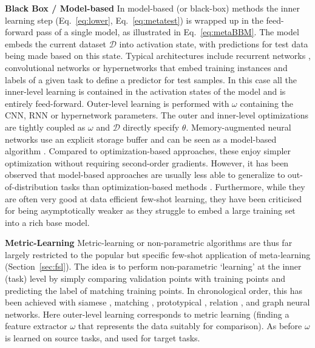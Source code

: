 \documentclass[10pt,journal,compsoc]{IEEEtran}
\newcommand{\keypoint}[1]{\vspace{0.1cm}\noindent\textbf{#1}\quad}
\begin{document}
\keypoint{Black Box / Model-based} In model-based (or black-box) methods the inner learning step (Eq.~\ref{eq:lower}, Eq.~\ref{eq:metatest}) is wrapped up in the feed-forward pass of a single model, as illustrated in Eq.~\ref{eq:metaBBM}. The model embeds the current dataset $\mathcal{D}$ into activation state, with predictions for test data being made based on this state. Typical architectures include recurrent networks \cite{hochreiter2001learning, ravi2016optimization}, convolutional networks \cite{mishra2017simple} or hypernetworks \cite{qiao2017parametersfromactivations, gidaris2018dynamicfewshot} that embed training instances and labels of a given task to define a predictor for test samples. In this case all the inner-level learning is contained in the activation states of the model and is entirely feed-forward. Outer-level learning is performed with $\omega$ containing the CNN, RNN or hypernetwork parameters. The outer and inner-level optimizations are tightly coupled as $\omega$ and $\mathcal{D}$ directly specify $\theta$. Memory-augmented neural networks \cite{graves2014neuralturing} use an explicit storage buffer and can be seen as a model-based algorithm \cite{santoro2016metamemory,munkhdalai2017metanets}. Compared to optimization-based approaches, these enjoy simpler optimization without requiring second-order gradients. However, it has been observed that model-based approaches are usually less able to generalize to out-of-distribution tasks than optimization-based methods \cite{finn2018metauniversal}. Furthermore, while they are often very good at data efficient few-shot learning, they have been criticised for being asymptotically weaker \cite{finn2018metauniversal} as they struggle to embed a large training set into a rich base model.

\keypoint{Metric-Learning} Metric-learning or non-parametric algorithms are thus far largely restricted to the popular but specific few-shot application of meta-learning (Section~\ref{sec:fsl}). The idea is to perform non-parametric `learning' at the inner (task) level by simply comparing validation points with training points and predicting the label of matching training points. In chronological order, this has been achieved with siamese \cite{kosh2015siameseoneshot}, matching  \cite{vinyals2016matching}, prototypical  \cite{snell2017prototypicalnets}, relation  \cite{sung2018relationnet}, and graph  \cite{garcia2018fewshot} neural networks. Here  outer-level learning corresponds to metric learning (finding a feature extractor $\omega$ that represents the data suitably for comparison). As before $\omega$ is learned on source tasks, and used for target tasks.
\end{document}
